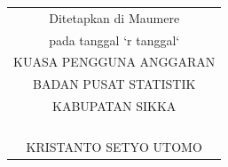 \documentclass{article}
\begin{document}
\bigskip
\hfill
\begin{tabular}{@{}c}

Ditetapkan di Maumere \\
pada tanggal `r tanggal` \bigskip\\


KUASA PENGGUNA ANGGARAN \\
BADAN PUSAT STATISTIK \\
KABUPATAN SIKKA \bigskip\\
\\
\\
\\
\\
KRISTANTO SETYO UTOMO
\end{tabular}
\end{document}
